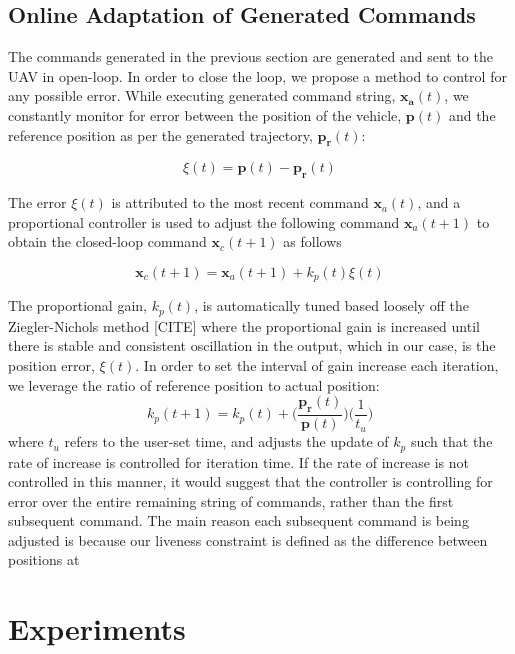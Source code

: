 \documentclass[letterpaper, 10 pt, conference]{ieeeconf}  %
\begin{document}
\subsection{Online Adaptation of Generated Commands}

The commands generated in the previous section are generated and sent to the UAV in open-loop. In order to close the loop, we propose a method to control for any possible error. While executing generated command string, $\mathbf{x_a}(t)$, we constantly monitor for error between the position of the vehicle, $\mathbf{p}(t)$ and the reference position as per the generated trajectory, $\mathbf{p_r}(t)$:

\begin{equation}
    \xi(t) = \mathbf{p}(t)-\mathbf{p_r}(t)
\end{equation}

The error $\xi(t)$ is attributed to the most recent command $\mathbf{x}_a(t)$, and a proportional controller is used to adjust the following command $\mathbf{x}_a(t+1)$ to obtain the closed-loop command $\mathbf{x}_c(t+1)$ as follows

\begin{equation}
    \mathbf{x}_c(t+1) = \mathbf{x}_a(t+1) + k_p(t)\xi(t)
\end{equation}

The proportional gain, $k_p(t)$, is automatically tuned based loosely off the Ziegler-Nichols method [CITE] where the proportional gain is increased until there is stable and consistent oscillation in the output, which in our case, is the position error, $\xi(t)$. In order to set the interval of gain increase each iteration, we leverage the ratio of reference position to actual position:
\begin{equation}
    k_p(t+1) = k_p(t) + \bigg(\frac{\mathbf{p_r}(t)}{\mathbf{p}(t)}\bigg)\bigg(\frac{1}{t_u}\bigg)
\end{equation}
where $t_u$ refers to the user-set time, and adjusts the update of $k_p$ such that the rate of increase is controlled for iteration time. If the rate of increase is not controlled in this manner, it would suggest that the controller is controlling for error over the entire remaining string of commands, rather than the first subsequent command. The main reason each subsequent command is being adjusted is because our liveness constraint is defined as the difference between positions at 






\section{Experiments}
\end{document}
